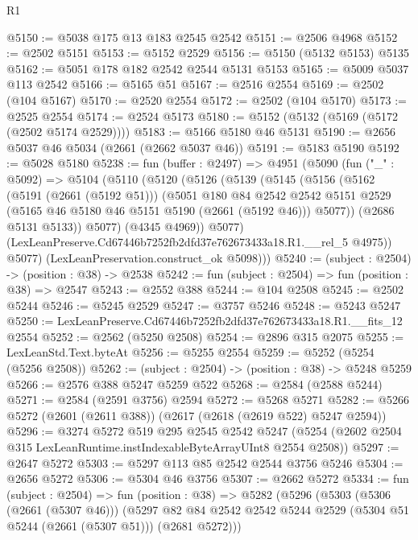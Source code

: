 \begin{lexlean}{R1}
\begin{coremodule}
@5150 := @5038 @175 @13 @183 @2545 @2542
@5151 := @2506 @4968
@5152 := @2502 @5151
@5153 := @5152 @2529
@5156 := @5150 (@5132 @5153) @5135
@5162 := @5051 @178 @182 @2542 @2544 @5131 @5153
@5165 := @5009 @5037 @113 @2542
@5166 := @5165 @51
@5167 := @2516 @2554
@5169 := @2502 (@104 @5167)
@5170 := @2520 @2554
@5172 := @2502 (@104 @5170)
@5173 := @2525 @2554
@5174 := @2524 @5173
@5180 := @5152 (@5132 (@5169 (@5172 (@2502 @5174 @2529))))
@5183 := @5166 @5180 @46 @5131
@5190 := @2656 @5037 @46 @5034 (@2661 (@2662 @5037 @46))
@5191 := @5183 @5190
@5192 := @5028 @5180
@5238 := fun (buffer : @2497) =>
  @4951
    (@5090
      (fun ("_" : @5092) =>
      @5104
        (@5110
          (@5120
            (@5126
              (@5139
                (@5145
                  (@5156
                    (@5162
                      (@5191 (@2661 (@5192 @51)))
                      (@5051
                        @180
                        @84
                        @2542
                        @2542
                        @5151
                        @2529
                        (@5165 @46 @5180 @46 @5151 @5190 (@2661 (@5192 @46)))
                        @5077))
                    (@2686 @5131 @5133))
                  @5077)
                (@4345 @4969))
              @5077)
            (LexLeanPreserve.Cd67446b7252fb2dfd37e762673433a18.R1.__rel_5 @4975))
          @5077)
        (LexLeanPreservation.construct_ok @5098)))
@5240 := (subject : @2504) -> (position : @38) -> @2538
@5242 := fun (subject : @2504) => fun (position : @38) => @2547
@5243 := @2552 @388
@5244 := @104 @2508
@5245 := @2502 @5244
@5246 := @5245 @2529
@5247 := @3757 @5246
@5248 := @5243 @5247
@5250 := LexLeanPreserve.Cd67446b7252fb2dfd37e762673433a18.R1.__fits_12 @2554
@5252 := @2562 (@5250 @2508)
@5254 := @2896 @315 @2075
@5255 := LexLeanStd.Text.byteAt
@5256 := @5255 @2554
@5259 := @5252 (@5254 (@5256 @2508))
@5262 := (subject : @2504) -> (position : @38) -> @5248 @5259
@5266 := @2576 @388 @5247 @5259 @522
@5268 := @2584 (@2588 @5244)
@5271 := @2584 (@2591 @3756) @2594
@5272 := @5268 @5271
@5282 := @5266 @5272 (@2601 (@2611 @388)) (@2617 (@2618 (@2619 @522) @5247 @2594))
@5296 := @3274
    @5272
    @519
    @295
    @2545
    @2542
    @5247
    (@5254 (@2602 @2504 @315 LexLeanRuntime.instIndexableByteArrayUInt8 @2554 @2508))
@5297 := @2647 @5272
@5303 := @5297 @113 @85 @2542 @2544 @3756 @5246
@5304 := @2656 @5272
@5306 := @5304 @46 @3756
@5307 := @2662 @5272
@5334 := fun (subject : @2504) =>
  fun (position : @38) =>
  @5282
    (@5296
      (@5303
        (@5306 (@2661 (@5307 @46)))
        (@5297 @82 @84 @2542 @2542 @5244 @2529 (@5304 @51 @5244 (@2661 (@5307 @51))) (@2681 @5272)))

\end{coremodule}
\end{lexlean}
